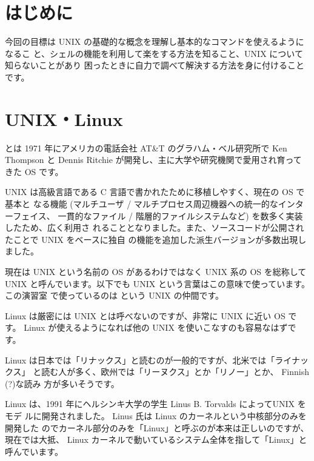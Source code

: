 \documentclass[platex]{jsarticle}
\begin{document}
\section{はじめに}

 今回の目標は UNIX の基礎的な概念を理解し基本的なコマンドを使えるようになるこ
 と、シェルの機能を利用して楽をする方法を知ること、UNIX について知らないことがあり
 困ったときに自力で調べて解決する方法を身に付けることです。



\section{UNIX・Linux}

  とは 1971 年にアメリカの電話会社 AT\&T のグラハム・ベル研究所で
 Ken Thompson と Dennis Ritchie が開発し、主に大学や研究機関で愛用され育って
 きた OS です。

 UNIX は高級言語である C 言語で書かれたために移植しやすく、現在の OS で基本と
 なる機能 (マルチユーザ / マルチプロセス周辺機器への統一的なインターフェイス、
 一貫的なファイル / 階層的ファイルシステムなど) を数多く実装したため、広く利用さ
 れることとなりました。また、ソースコードが公開されたことで UNIX をベースに独自
 の機能を追加した派生バージョンが多数出現しました。

 現在は UNIX という名前の OS があるわけではなく UNIX 系の OS を総称して UNIX
 と呼んでいます。以下でも UNIX という言葉はこの意味で使っています。この演習室
 で使っているのは  という UNIX の仲間です。

 Linux は厳密には UNIX とは呼べないのですが、非常に UNIX に近い OS です。
 Linux が使えるようになれば他の UNIX を使いこなすのも容易なはずです。

 \begin{プチノート}
  Linux は日本では「リナックス」と読むのが一般的ですが、北米では「ライナックス」
  と読む人が多く、欧州では「リーヌクス」とか「リノー」とか、 Finnish (?)な読み
  方が多いそうです。
 \end{プチノート}

 Linux は、1991 年にヘルシンキ大学の学生 Linus B. Torvalds によってUNIX をモデ
 ルに開発されました。 Linus 氏は Linux のカーネルという中核部分のみを開発した
 のでカーネル部分のみを「Linux」と呼ぶのが本来は正しいのですが、現在では大抵、
 Linux カーネルで動いているシステム全体を指して「Linux」と呼んでいます。
\end{document}
